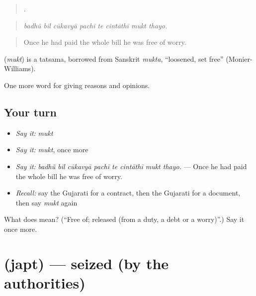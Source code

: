 \begin{quote}
       .
\end{quote}

\begin{quote}
\emph{badhũ bil cūkavyā pachī te cintāthī mukt thayo.}
\end{quote}

\begin{quote}
Once he had paid the whole bill he was free of worry.
\end{quote}

\begin{cousinweb}
\textbf{} (\emph{mukt}) is a tatsama, borrowed from Sanskrit \emph{mukta}, \textquotedblleft{}loosened, set free\textquotedblright{} (Monier-Williams).
\end{cousinweb}

\begin{grammarlens}[title={What you've built}]
One more word for giving reasons and opinions.
\end{grammarlens}

\subsection*{Your turn}
\begin{itemize}
\raggedright
  \item \emph{Say it:} \emph{mukt}
  \item \emph{Say it:} \emph{mukt}, once more
  \item \emph{Say it:} \emph{badhũ bil cūkavyā pachī te cintāthī mukt thayo.} — Once he had paid the whole bill he was free of worry.
  \item \emph{Recall:} say the Gujarati for a contract, then the Gujarati for a document, then say \emph{mukt} again
\end{itemize}

\begin{tcolorbox}[breakable,colback=teal!4,colframe=teal!35!black,title={Before you move on}]
What does  mean? (\textquotedblleft{}Free of; released (from a duty, a debt or a worry)\textquotedblright{}.) Say it once more.
\end{tcolorbox}
\section[\texorpdfstring{\gu{જપ્ત} (japt)}{જપ્ત (japt)}]{ (japt) — seized (by the authorities)}

